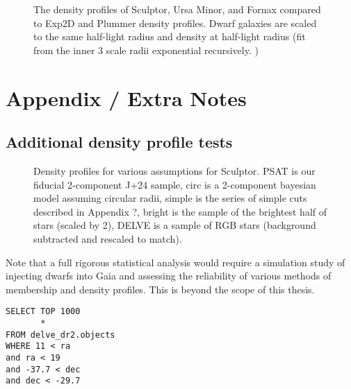 \begin{figure}
\centering
{}
\caption[Classical dwarf density profiles]{The density profiles of
Sculptor, Ursa Minor, and Fornax compared to Exp2D and Plummer density
profiles. Dwarf galaxies are scaled to the same half-light radius and
density at half-light radius (fit from the inner 3 scale radii
exponential recursively. )}\label{fig:classical_dwarfs_densities}
\end{figure}

\section{Appendix / Extra Notes}\label{appendix-extra-notes}

\subsection{Additional density profile
tests}\label{additional-density-profile-tests}

\begin{figure}
\centering
{}
\caption[Density profiles]{Density profiles for various assumptions for
Sculptor. PSAT is our fiducial 2-component J+24 sample, circ is a
2-component bayesian model assuming circular radii, simple is the series
of simple cuts described in Appendix ?, bright is the sample of the
brightest half of stars (scaled by 2), DELVE is a sample of RGB stars
(background subtracted and rescaled to
match).}\label{fig:sculptor_observed_profiles}
\end{figure}

Note that a full rigorous statistical analysis would require a
simulation study of injecting dwarfs into Gaia and assessing the
reliability of various methods of membership and density profiles. This
is beyond the scope of this thesis.

\begin{verbatim}
SELECT TOP 1000
       *
FROM delve_dr2.objects
WHERE 11 < ra
and ra < 19
and -37.7 < dec
and dec < -29.7
\end{verbatim}
